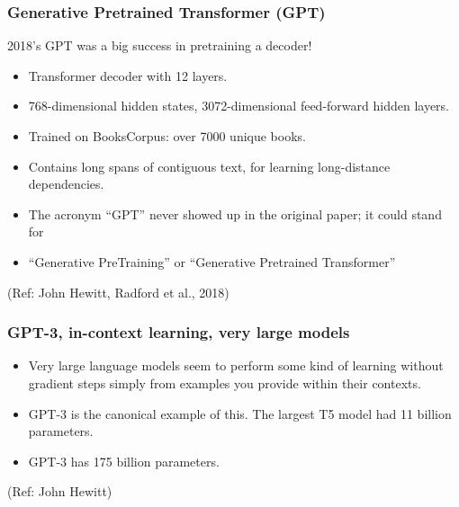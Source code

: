 \begin{frame}[fragile]\frametitle{Generative Pretrained Transformer (GPT)}



2018’s GPT was a big success in pretraining a decoder!


      \begin{itemize}
			\item Transformer decoder with 12 layers.
			\item 768-dimensional hidden states, 3072-dimensional feed-forward hidden layers.
			\item Trained on BooksCorpus: over 7000 unique books.
			\item Contains long spans of contiguous text, for learning long-distance dependencies.
			\item The acronym ``GPT'' never showed up in the original paper; it could stand for
			\item ``Generative PreTraining'' or ``Generative Pretrained Transformer''
			\end{itemize}

			
			{\tiny (Ref: John Hewitt, Radford et al., 2018)}

\end{frame}

\begin{frame}[fragile]\frametitle{GPT-3, in-context learning, very large models}


      \begin{itemize}
			\item Very large language models seem to perform some kind of learning without gradient  steps simply from examples you provide within their contexts.
			\item GPT-3 is the canonical example of this. The largest T5 model had 11 billion parameters.
			\item GPT-3 has 175 billion parameters.

			\end{itemize}

			{\tiny (Ref: John Hewitt)}

\end{frame}





